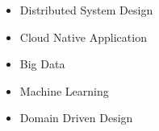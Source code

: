 \documentclass[10pt,a4paper]{altacv}
\begin{document}
\divider
\medskip






\begin{itemize}

\item Distributed System Design 
\item Cloud Native Application
\item Big Data 
\item Machine Learning 
\item Domain Driven Design 
\end{itemize}

\divider

\medskip

\clearpage


\end{document}
